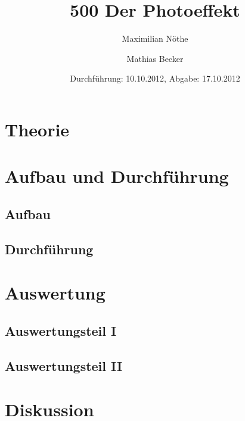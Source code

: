 \documentclass[titlepage=firstiscover]{scrartcl}
\title{500 Der Photoeffekt}
\author{Maximilian Nöthe \and Mathias Becker}
\date{Durchführung: 10.10.2012, Abgabe: 17.10.2012}
\begin{document}
\maketitle
\tableofcontents
\newpage

\section{Theorie}

\section{Aufbau und Durchführung}

\subsection{Aufbau}
\subsection{Durchführung}

\section{Auswertung}
\subsection{Auswertungsteil I}
\subsection{Auswertungsteil II}

\section{Diskussion}
\end{document}
